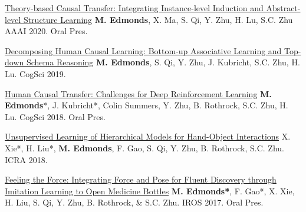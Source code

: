 


\begin{cvpublications}

\item \cvpublication
{\href{https://mjedmonds.com/papers/AAAI20_OpenLockLearnerTransferRL_final.pdf}{Theory-based Causal Transfer: Integrating Instance-level Induction and Abstract-level Structure Learning}} %
{\textbf{M. Edmonds}, X. Ma, S. Qi, Y. Zhu, H. Lu, S.C. Zhu} %
{AAAI 2020.} %
{Oral Pres.} %

 \item \cvpublication
{\href{http://www.mjedmonds.com/papers/CogSci19_OpenLockLearner_final.pdf}{Decomposing Human Causal Learning: Bottom-up Associative Learning and Top-down Schema Reasoning}} %
{\textbf{M. Edmonds}, S. Qi, Y. Zhu,  J. Kubricht, S.C. Zhu, H. Lu.} %
{CogSci 2019.} %
{} %

\item \cvpublication
{\href{http://www.mjedmonds.com/papers/CogSci18_OpenLock_CausalRL_final.pdf}{Human Causal Transfer: Challenges for Deep Reinforcement Learning}} %
{\textbf{M. Edmonds}*, J. Kubricht*, Colin Summers, Y. Zhu, B. Rothrock, S.C. Zhu, H. Lu.} %
{CogSci 2018.} %
{Oral Pres.} %

\item \cvpublication
{\href{http://www.mjedmonds.com/papers/ICRA18_Unsupervised_learning_hierarchical_hoi.pdf}{Unsupervised Learning of Hierarchical Models for Hand-Object Interactions}} %
{X. Xie*, H. Liu*, \textbf{M. Edmonds}, F. Gao, S. Qi, Y. Zhu, B. Rothrock, S.C. Zhu.} %
{ICRA 2018.} %
{} %

\item \cvpublication
{\href{http://www.mjedmonds.com/papers/IROS17_OpenBottle_final.pdf}{Feeling the Force: Integrating Force and Pose for Fluent Discovery through Imitation Learning to Open Medicine Bottles}} %
{\textbf{M. Edmonds*}, F. Gao*, X. Xie, H. Liu, S. Qi, Y. Zhu, B. Rothrock, \& S.C. Zhu.} %
{IROS 2017.} %
{Oral Pres.} %


\end{cvpublications}
